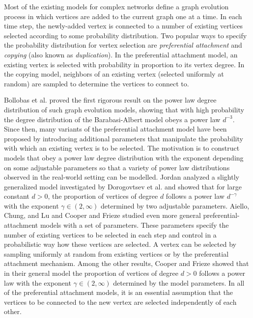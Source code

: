 \documentclass[11pt]{article}
\begin{document}
Most of the existing models for complex networks
define a graph evolution process in which vertices are added to the current graph one at a time.
In each time step, the newly-added vertex is connected to
a number of existing vertices selected according to some probability distribution.
Two popular ways to specify the probability distribution for vertex selection are \textit{preferential attachment}
and \textit{copying}
(also known as \textit{duplication}). In the preferential attachment model, an existing vertex is selected with probability
in proportion to its vertex degree. In the copying model, neighbors of an existing vertex (selected uniformly at random) are
sampled to determine the vertices to connect to.


Bollobas et al. \cite{bollobas01scalefree}  proved the first rigorous result on the power law degree distribution of such
graph evolution models, showing that with high probability the degree distribution of the Barabasi-Albert model \cite{albert02complex}
obeys a power law $d^{-3}$.
Since then, many variants of the preferential attachment model have been proposed
by introducing additional parameters that manipulate the probability with which an existing vertex is to be selected. The motivation
is to construct models that obey a power law degree distribution with the exponent depending on some adjustable parameters so that
a variety of power law distributions observed in the real-world setting can be modelled.
Jordan \cite{jordan06} analyzed a slightly generalized model investigated by Dorogovtsev et al. \cite{dorog00}
and showed that for large constant $d > 0$, the proportion of vertices of  degree $d$
follows a power law $d^{-\gamma}$ with the exponent $\gamma \in (2, \infty)$ determined by two adjustable parameters.
Aiello, Chung, and Lu \cite{aiello01} and Cooper and Frieze \cite{cooper03} studied even more general
preferential-attachment  models with a set of parameters. These parameters specify the number of existing vertices to be selected in each step and control in a
probabilistic way how these vertices are selected. A vertex can be selected by sampling uniformly at random from existing vertices or by the preferential attachment mechanism.
Among the other results, Cooper and Frieze showed that in their general model the proportion of vertices of degree $d > 0$ follows a power law with the
exponent $\gamma \in (2, \infty)$ determined by the model parameters. In all of the preferential attachment
models, it is an essential assumption that the vertices to be connected to the new vertex are selected independently of each other.
\end{document}
